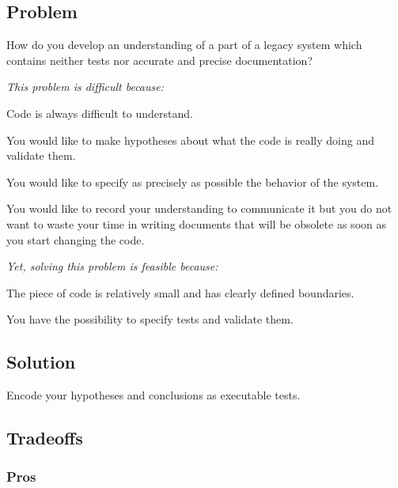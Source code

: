 \documentclass[a4paper,10pt,twoside]{book}
\begin{document}
\subsection*{Problem}

How do you develop an understanding of a part of a legacy system which contains neither tests nor accurate and precise documentation?

\emph{This problem is difficult because:}

\begin{bulletlist}
\item Code is always difficult to understand.
\item You would like to make hypotheses about what the code is really doing and validate them.
\item You would like to specify as precisely as possible the behavior of the system.
\item You would like to record your understanding to communicate it but you do not want to waste your time in writing documents that will be obsolete as soon as you start changing the code. 
\end{bulletlist}

\emph{Yet, solving this problem is feasible because:}

\begin{bulletlist}
\item The piece of code is relatively small and has clearly defined boundaries.
\item You have the possibility to specify tests and validate them.
\end{bulletlist}

\subsection*{Solution}

Encode your hypotheses and conclusions as executable tests.

\subsection*{Tradeoffs}

\subsubsection*{Pros}
\end{document}
